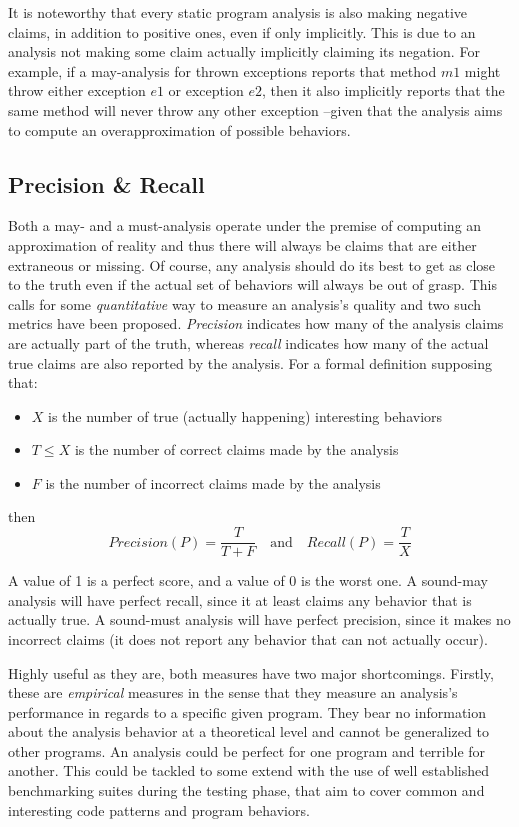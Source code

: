 It is noteworthy that every static program analysis is also making negative claims, in addition to positive ones, even if only implicitly. This is due to an analysis not making some claim actually implicitly claiming its negation. For example, if a may-analysis for thrown exceptions reports that method $m1$ might throw either exception $e1$ or exception $e2$, then it also implicitly reports that the same method will never throw any other exception --given that the analysis aims to compute an overapproximation of possible behaviors.

\subsection{Precision \& Recall}

Both a may- and a must-analysis operate under the premise of computing an approximation of reality and thus there will always be claims that are either extraneous or missing. Of course, any analysis should do its best to get as close to the truth even if the actual set of behaviors will always be out of grasp. This calls for some \emph{quantitative} way to measure an analysis's quality and two such metrics have been proposed. \emph{Precision} indicates how many of the analysis claims are actually part of the truth, whereas \emph{recall} indicates how many of the actual true claims are also reported by the analysis. For a formal definition supposing that:
\begin{itemize}
    \item $X$ is the number of true (actually happening) interesting behaviors
    \item $T \leq X$ is the number of correct claims made by the analysis
    \item $F$ is the number of incorrect claims made by the analysis
\end{itemize}
then
\[
Precision(P) = \frac{T}{T + F}
\quad \textrm{and} \quad
Recall(P) = \frac{T}{X}
\]

A value of 1 is a perfect score, and a value of 0 is the worst one. A sound-may analysis will have perfect recall, since it at least claims any behavior that is actually true. A sound-must analysis will have perfect precision, since it makes no incorrect claims (it does not report any behavior that can not actually occur).

Highly useful as they are, both measures have two major shortcomings. Firstly, these are \emph{empirical} measures in the sense that they measure an analysis's performance in regards to a specific given program. They bear no information about the analysis behavior at a theoretical level and cannot be generalized to other programs. An analysis could be perfect for one program and terrible for another. This could be tackled to some extend with the use of well established benchmarking suites during the testing phase, that aim to cover common and interesting code patterns and program behaviors.

